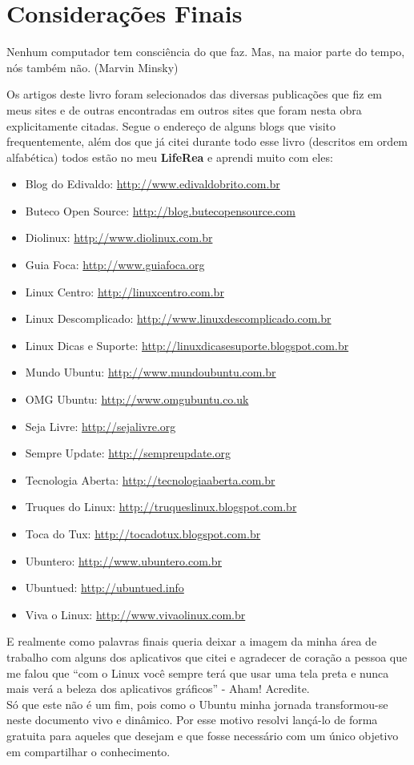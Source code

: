 \documentclass[a4paper,11pt]{book} %
\begin{document}
\chapter{Considerações Finais}
\begin{remark}
Nenhum computador tem consciência do que faz. 
Mas, na maior parte do tempo, nós também não. (Marvin Minsky)
\end{remark}
Os artigos deste livro foram selecionados das diversas publicações que fiz em meus sites e de outras encontradas em outros sites que foram nesta obra explicitamente citadas. Segue o  endereço de alguns blogs que visito frequentemente, além dos que já citei durante todo esse livro (descritos em ordem alfabética) todos estão no meu \textbf{LifeRea} e aprendi muito com eles:
\begin{itemize}[noitemsep]
 \item Blog do Edivaldo: \url{http://www.edivaldobrito.com.br}
 \item Buteco Open Source: \url{http://blog.butecopensource.com}
 \item Diolinux: \url{http://www.diolinux.com.br}
 \item Guia Foca: \url{http://www.guiafoca.org}
 \item Linux Centro: \url{http://linuxcentro.com.br}
 \item Linux Descomplicado: \url{http://www.linuxdescomplicado.com.br}
 \item Linux Dicas e Suporte: \url{http://linuxdicasesuporte.blogspot.com.br}
 \item Mundo Ubuntu: \url{http://www.mundoubuntu.com.br}
 \item OMG Ubuntu: \url{http://www.omgubuntu.co.uk}
 \item Seja Livre: \url{http://sejalivre.org}
 \item Sempre Update: \url{http://sempreupdate.org}
 \item Tecnologia Aberta: \url{http://tecnologiaaberta.com.br}
 \item Truques do Linux: \url{http://truqueslinux.blogspot.com.br}
 \item Toca do Tux: \url{http://tocadotux.blogspot.com.br}
 \item Ubuntero: \url{http://www.ubuntero.com.br}
 \item Ubuntued: \url{http://ubuntued.info}
 \item Viva o Linux: \url{http://www.vivaolinux.com.br}
\end{itemize}
E realmente como palavras finais queria deixar a imagem da minha área de trabalho com alguns dos aplicativos que citei e agradecer de coração a pessoa que me falou que “com o Linux você sempre terá que usar uma tela preta e nunca mais verá a beleza dos aplicativos gráficos” - Aham! Acredite. \\[3mm]
Só que este não é um fim, pois como o Ubuntu minha jornada transformou-se neste documento vivo e dinâmico. Por esse motivo resolvi lançá-lo de forma gratuita para aqueles que desejam e que fosse necessário com um único objetivo em compartilhar o conhecimento.
\end{document}
